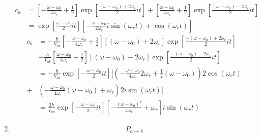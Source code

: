 \begin{enumerate}
\begin{align*}
          \end{align*}
          \begin{align*}
              c_a & = \left[ -\frac{\omega-\omega_0}{4\omega_r} + \frac{1}{2}\right]
              \exp\left[
                      \frac{(\omega-\omega_0) + 2\omega_r}{2} it
                      \right] +
              \left[ \frac{\omega-\omega_0}{4\omega_r} + \frac{1}{2}\right]
              \exp\left[
                      \frac{(\omega-\omega_0) - 2\omega_r}{2} it
                      \right] \\
                  & =
              \exp\left[
                      \frac{\omega-\omega_0}{2}it
                      \right]
              \left[-\frac{\omega-\omega_0}{2\omega_r}
                  i\sin (\omega_r t)
                  +
                  \cos(\omega_r t)\right]
          \end{align*}
          \begin{align*}
              c_b & =
              -\frac{\hbar }{V_{ab}}
              \left[-\frac{\omega-\omega_0}{4\omega_r} + \frac{1}{2}\right]
              [(\omega-\omega_0) + 2\omega_r]
              \exp\left[
                      \frac{-(\omega-\omega_0) + 2\omega_r}{2} it
                      \right] \\
                  & - \frac{\hbar}{ V_{ab}}
              \left[\frac{\omega-\omega_0}{4\omega_r} + \frac{1}{2}\right]
              [(\omega-\omega_0) - 2\omega_r]
              \exp\left[
                      \frac{-(\omega-\omega_0) - 2\omega_r}{2} it
                      \right] \\
                  & =
              -\frac{\hbar}{V_{ab}}
              \exp\left[-\frac{\omega-\omega_0}{2}it\right]
              \bigg[
                  (-\frac{\omega-\omega_0}{4\omega_r}2\omega_r + \frac{1}{2}(\omega-\omega_0))
                  2\cos(\omega_r t)\\
                  +
                  & (-\frac{\omega-\omega_0}{4\omega_r}(\omega-\omega_0)+\omega_r)
                  2i\sin(\omega_r t)
                  \bigg] \\
                  & =
              \frac{2\hbar}{V_{ab}}
              \exp\left[-\frac{\omega-\omega_0}{2}it\right]
              \left[-\frac{(\omega-\omega_0)^2}{4\omega_r}+ \omega_r\right]
              i\sin(\omega_r t)
          \end{align*}
    \item
          \begin{align*}
              P_{a\to b}

\end{align*}
\end{enumerate}
